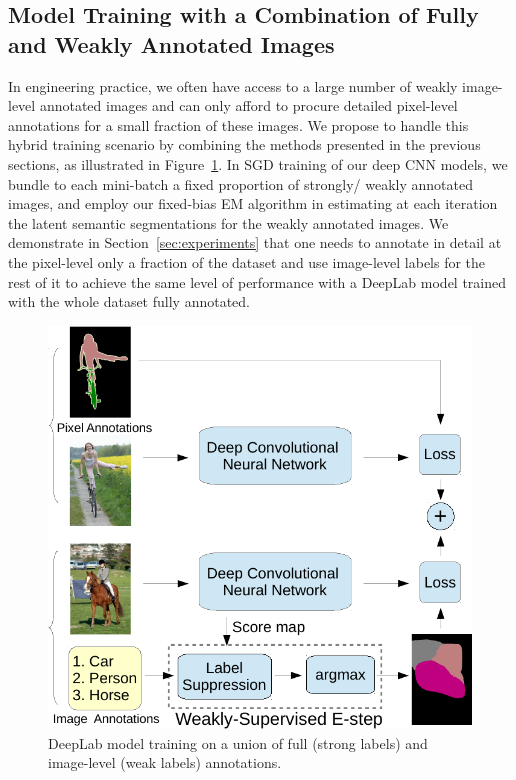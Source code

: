 \subsection{Model Training with a Combination of Fully and Weakly Annotated Images}

In engineering practice, we often have access to a large number of
weakly image-level annotated images and can only afford to procure
detailed pixel-level annotations for a small fraction of these
images. We propose to handle this hybrid training scenario by
combining the methods presented in the previous sections, as
illustrated in Figure~\ref{fig:model_illustrations_twoEnd}. In SGD
training of our deep CNN models, we bundle to each mini-batch a fixed
proportion of strongly/ weakly annotated images, and employ our
fixed-bias EM algorithm in estimating at each iteration the latent
semantic segmentations for the weakly annotated images. We demonstrate
in Section~\ref{sec:experiments} that one needs to annotate in
detail at the pixel-level only a fraction of the dataset and use
image-level labels for the rest of it to achieve the same level of
performance with a DeepLab model trained with the whole dataset fully
annotated.

\begin{figure}[htbp!]
  \centering
  \includegraphics[width=0.9\linewidth]{fig/model_train_twoEnd.pdf} 
  \caption{DeepLab model training on a union of full (strong labels) 
    and image-level (weak labels) annotations.}
  \label{fig:model_illustrations_twoEnd}
\end{figure}

